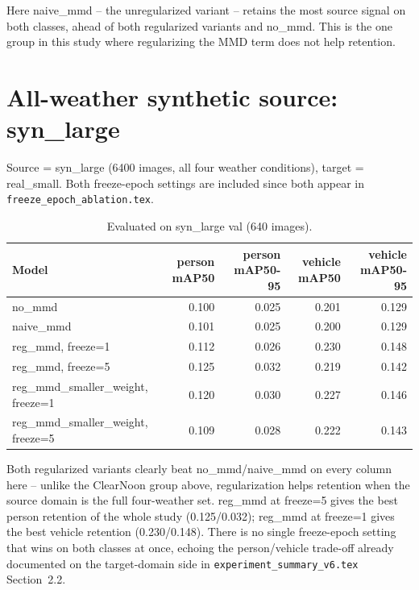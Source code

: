 \documentclass[11pt]{article}
\begin{document}
\noindent Here naive\_mmd -- the unregularized variant -- retains the most source
signal on both classes, ahead of both regularized variants and no\_mmd. This is the
one group in this study where regularizing the MMD term does not help retention.

\section{All-weather synthetic source: syn\_large}

Source = syn\_large (6400 images, all four weather conditions), target = real\_small.
Both freeze-epoch settings are included since both appear in
\texttt{freeze\_epoch\_ablation.tex}.

\begin{table}[h!]
    \centering
    \small
    \begin{tabular}{lrrrr}
        \toprule
        Model & person mAP50 & person mAP50-95 & vehicle mAP50 & vehicle mAP50-95 \\
        \midrule
        no\_mmd                                    & 0.100 & 0.025 & 0.201 & 0.129 \\
        naive\_mmd                                 & 0.101 & 0.025 & 0.200 & 0.129 \\
        reg\_mmd, freeze=1                          & 0.112 & 0.026 & 0.230 & 0.148 \\
        reg\_mmd, freeze=5                          & 0.125 & 0.032 & 0.219 & 0.142 \\
        reg\_mmd\_smaller\_weight, freeze=1          & 0.120 & 0.030 & 0.227 & 0.146 \\
        reg\_mmd\_smaller\_weight, freeze=5          & 0.109 & 0.028 & 0.222 & 0.143 \\
        \bottomrule
    \end{tabular}
    \caption{Evaluated on syn\_large val (640 images).}
\end{table}

\noindent Both regularized variants clearly beat no\_mmd/naive\_mmd on every column
here -- unlike the ClearNoon group above, regularization helps retention when the
source domain is the full four-weather set. reg\_mmd at freeze=5 gives the best
person retention of the whole study (0.125/0.032); reg\_mmd at freeze=1 gives the
best vehicle retention (0.230/0.148). There is no single freeze-epoch setting that
wins on both classes at once, echoing the person/vehicle trade-off already documented
on the target-domain side in \texttt{experiment\_summary\_v6.tex} Section~2.2.
\end{document}
